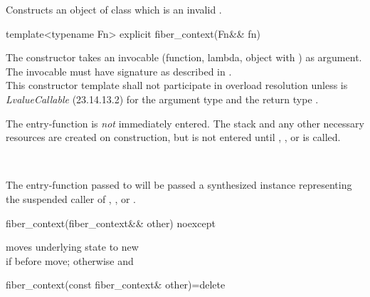 \begin{itemdescr}
\pnum
\effects Constructs an object of class  which is an invalid \fiber.\\
\postconditions {}
\end{itemdescr}

\begin{itemdecl}
template<typename Fn>
explicit fiber_context(Fn&& fn)
\end{itemdecl}

\begin{itemdescr}
\pnum
The constructor takes an invocable (function, lambda, object with \op) as
argument. The invocable must have signature as described in
.\\
This constructor template shall not participate in overload resolution unless
 is \emph{LvalueCallable} (23.14.13.2) for the argument type
 and the return type \fiber.\\
\begin{note}The entry-function  is \emph{not} immediately entered. The
stack and any other necessary resources are created on construction, but
 is not entered until \resume, \resumewith, \xtresume or
\xtresumewith is called.\end{note}\\
\begin{note}The entry-function  passed to \fiber will be passed a
synthesized \fiber instance representing the suspended caller of \resume,
\resumewith, \xtresume or \xtresumewith.\end{note}
\end{itemdescr}

\begin{itemdecl}
fiber_context(fiber_context&& other) noexcept
\end{itemdecl}

\begin{itemdescr}
\pnum
moves underlying state to new \fiber\\
\postconditions {} if  before move; otherwise
 and 
\end{itemdescr}

\begin{itemdecl}
fiber_context(const fiber_context& other)=delete
\end{itemdecl}


